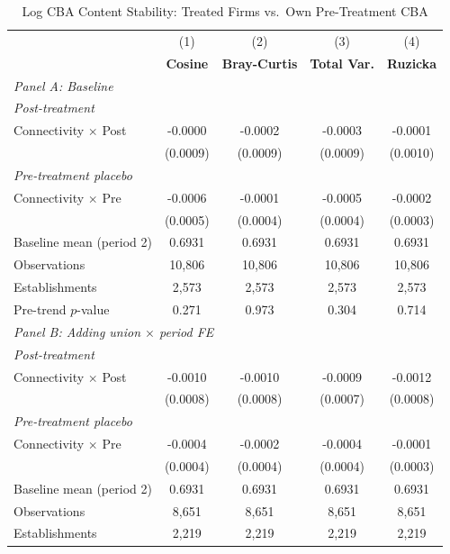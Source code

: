 \begin{table}[H]
\centering
\caption{Log CBA Content Stability: Treated Firms vs.\ Own Pre-Treatment CBA}
\label{tab:treated_self_ln_cba_similarity}
\scriptsize
\setlength{\tabcolsep}{8pt}
\begin{tabular}{lcccc}
\toprule\toprule
 & (1) & (2) & (3) & (4) \\
 & \textbf{Cosine} & \textbf{Bray-Curtis} & \textbf{Total Var.} & \textbf{Ruzicka} \\
\midrule
\multicolumn{5}{l}{\textit{Panel A: Baseline}} \\
\multicolumn{5}{l}{\textit{Post-treatment}} \\
Connectivity $\times$ Post & -0.0000 & -0.0002 & -0.0003 & -0.0001 \\
 & (0.0009) & (0.0009) & (0.0009) & (0.0010) \\
\multicolumn{5}{l}{\textit{Pre-treatment placebo}} \\
Connectivity $\times$ Pre & -0.0006 & -0.0001 & -0.0005 & -0.0002 \\
 & (0.0005) & (0.0004) & (0.0004) & (0.0003) \\
\midrule
Baseline mean (period 2) & 0.6931 & 0.6931 & 0.6931 & 0.6931 \\
Observations &       10,806 &       10,806 &       10,806 &       10,806 \\
Establishments &        2,573 &        2,573 &        2,573 &        2,573 \\
Pre-trend $p$-value & 0.271 & 0.973 & 0.304 & 0.714 \\
\midrule
\multicolumn{5}{l}{\textit{Panel B: Adding union $\times$ period FE}} \\
\multicolumn{5}{l}{\textit{Post-treatment}} \\
Connectivity $\times$ Post & -0.0010 & -0.0010 & -0.0009 & -0.0012 \\
 & (0.0008) & (0.0008) & (0.0007) & (0.0008) \\
\multicolumn{5}{l}{\textit{Pre-treatment placebo}} \\
Connectivity $\times$ Pre & -0.0004 & -0.0002 & -0.0004 & -0.0001 \\
 & (0.0004) & (0.0004) & (0.0004) & (0.0003) \\
\midrule
Baseline mean (period 2) & 0.6931 & 0.6931 & 0.6931 & 0.6931 \\
Observations &        8,651 &        8,651 &        8,651 &        8,651 \\
Establishments &        2,219 &        2,219 &        2,219 &        2,219 \\

\end{tabular}
\end{table}

